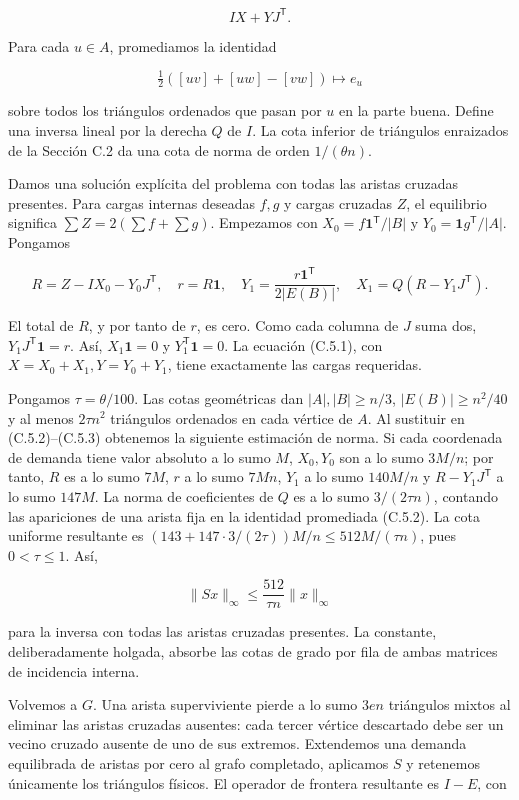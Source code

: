 \documentclass[spanish,11pt,a4paper]{article}
\begin{document}
\[IX+YJ^{\mathsf T}.
\tag{C.5.1}\]

Para cada \(u\in A\), promediamos la identidad

\[\tfrac12([uv]+[uw]-[vw])\longmapsto e_u
\tag{C.5.2}\]

sobre todos los triángulos ordenados que pasan por \(u\) en la parte buena. Define una inversa lineal por la derecha \(Q\) de \(I\). La cota inferior de triángulos enraizados de la Sección C.2 da una cota de norma de orden \(1/(\theta n)\).

Damos una solución explícita del problema con todas las aristas cruzadas presentes. Para cargas internas deseadas \(f,g\) y cargas cruzadas \(Z\), el equilibrio significa \(\sum Z=2(\sum f+\sum g)\). Empezamos con \(X_0=f\mathbf1^{\mathsf T}/|B|\) y \(Y_0=\mathbf1g^{\mathsf T}/|A|\). Pongamos

\[R=Z-IX_0-Y_0J^{\mathsf T},\quad r=R\mathbf1,\quad
Y_1=\frac{r\mathbf1^{\mathsf T}}{2|E(B)|},\quad
X_1=Q(R-Y_1J^{\mathsf T}).
\tag{C.5.3}\]

El total de \(R\), y por tanto de \(r\), es cero. Como cada columna de \(J\) suma dos, \(Y_1J^{\mathsf T}\mathbf1=r\). Así, \(X_1\mathbf1=0\) y \(Y_1^{\mathsf T}\mathbf1=0\). La ecuación (C.5.1), con \(X=X_0+X_1,Y=Y_0+Y_1\), tiene exactamente las cargas requeridas.

Pongamos \(\tau=\theta/100\). Las cotas geométricas dan \(|A|,|B|\ge n/3\), \(|E(B)|\ge n^2/40\) y al menos \(2\tau n^2\) triángulos ordenados en cada vértice de \(A\). Al sustituir en (C.5.2)--(C.5.3) obtenemos la siguiente estimación de norma. Si cada coordenada de demanda tiene valor absoluto a lo sumo \(M\), \(X_0,Y_0\) son a lo sumo \(3M/n\); por tanto, \(R\) es a lo sumo \(7M\), \(r\) a lo sumo \(7Mn\), \(Y_1\) a lo sumo \(140M/n\) y \(R-Y_1J^{\mathsf T}\) a lo sumo \(147M\). La norma de coeficientes de \(Q\) es a lo sumo \(3/(2\tau n)\), contando las apariciones de una arista fija en la identidad promediada (C.5.2). La cota uniforme resultante es \((143+147\cdot3/(2\tau))M/n\le512M/(\tau n)\), pues \(0<\tau\le1\). Así,

\[\|Sx\|_\infty\le\frac{512}{\tau n}\|x\|_\infty
\tag{C.5.4}\]

para la inversa con todas las aristas cruzadas presentes. La constante, deliberadamente holgada, absorbe las cotas de grado por fila de ambas matrices de incidencia interna.

Volvemos a \(G\). Una arista superviviente pierde a lo sumo \(3en\) triángulos mixtos al eliminar las aristas cruzadas ausentes: cada tercer vértice descartado debe ser un vecino cruzado ausente de uno de sus extremos. Extendemos una demanda equilibrada de aristas por cero al grafo completado, aplicamos \(S\) y retenemos únicamente los triángulos físicos. El operador de frontera resultante es \(I-E\), con
\end{document}
